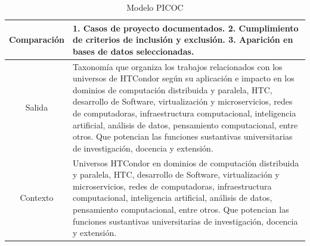 \begin{table}[H]
\begin{tabular}{|c|p{12cm}|}
		Comparación         &
		\textbf{1.} Casos de proyecto documentados.
		\textbf{2.} Cumplimiento de criterios de inclusión y exclusión.
		\textbf{3.} Aparición en bases de datos seleccionadas.                                                                                                                                                                                                                                                                                                                                                                                                                                                                 \\ \hline
		Salida              & Taxonomía que organiza los trabajos relacionados con los universos de HTCondor según su aplicación e impacto en los dominios de computación distribuida y paralela, HTC, desarrollo de Software, virtualización y microservicios, redes de computadoras, infraestructura computacional, inteligencia artificial, análisis de datos, pensamiento computacional, entre otros. Que potencian las funciones sustantivas universitarias de investigación, docencia y extensión.                       \\ \hline
		Contexto            & Universos HTCondor en dominios de computación distribuida y paralela, HTC, desarrollo de Software, virtualización y microservicios, redes de computadoras, infraestructura computacional, inteligencia artificial, análisis de datos, pensamiento computacional, entre otros. Que potencian las funciones sustantivas universitarias de investigación, docencia y extensión.                                                                                                                     \\ \hline
	\end{tabular}
	\caption{Modelo PICOC}
\end{table}


